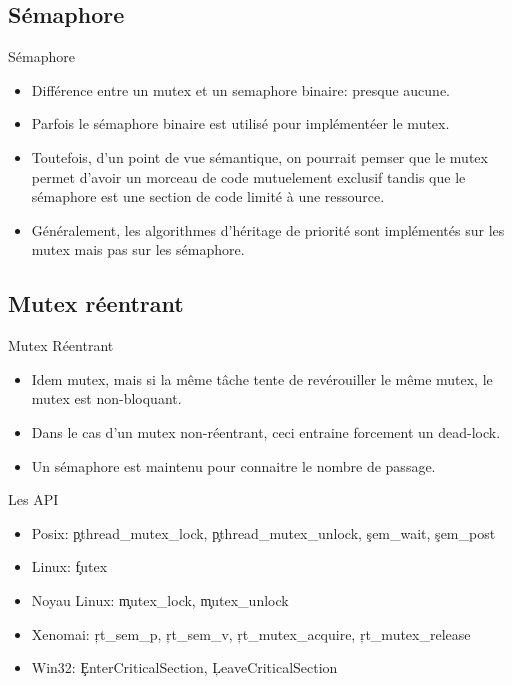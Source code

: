 \subsection{Sémaphore}

\begin{frame}{Sémaphore}
  \begin{itemize} 
  \item  Différence entre un  mutex et  un semaphore  binaire: presque
    aucune.
  \item Parfois le sémaphore  binaire est utilisé pour implémentéer le
    mutex.
  \item Toutefois,  d'un point de  vue sémantique, on  pourrait pemser
    que  le  mutex  permet  d'avoir  un morceau  de  code  mutuelement
    exclusif tandis que le sémaphore  est une section de code limité à
    une ressource.
  \item  Généralement,  les algorithmes  d'héritage  de priorité  sont
    implémentés sur les mutex mais pas sur les sémaphore.
  \end{itemize} 
\end{frame} 

\subsection{Mutex réentrant}

\begin{frame}{Mutex Réentrant}
  \begin{itemize} 
  \item Idem  mutex, mais  si la même  tâche tente de  revérouiller le
    même mutex, le mutex est non-bloquant.
  \item Dans le cas  d'un mutex non-réentrant, ceci entraine forcement
    un dead-lock.
  \item Un sémaphore est maintenu pour connaitre le nombre de passage.
  \end{itemize} 
\end{frame} 

\begin{frame}[fragile=singleslide]{Les API}
  \begin{itemize} 
  \item   Posix:   \c{pthread_mutex_lock},   \c{pthread_mutex_unlock},
    \c{sem_wait}, \c{sem_post}
  \item Linux: \c{futex}
  \item Noyau Linux: \c{mutex_lock}, \c{mutex_unlock}
  \item  Xenomai:  \c{rt_sem_p},  \c{rt_sem_v},  \c{rt_mutex_acquire},
    \c{rt_mutex_release}
    \item Win32: \c{EnterCriticalSection}, \c{LeaveCriticalSection}
  \end{itemize} 
\end{frame} 


